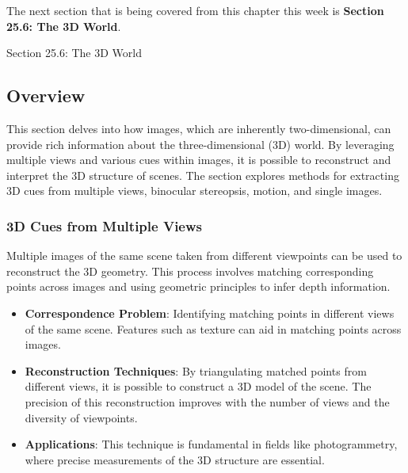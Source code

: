 The next section that is being covered from this chapter this week is \textbf{Section 25.6: The 3D World}.

\begin{notes}{Section 25.6: The 3D World}
    \subsection*{Overview}

    This section delves into how images, which are inherently two-dimensional, can provide rich information about the three-dimensional (3D) world. By leveraging multiple views and various cues within 
    images, it is possible to reconstruct and interpret the 3D structure of scenes. The section explores methods for extracting 3D cues from multiple views, binocular stereopsis, motion, and single images.
    
    \subsubsection*{3D Cues from Multiple Views}
    
    Multiple images of the same scene taken from different viewpoints can be used to reconstruct the 3D geometry. This process involves matching corresponding points across images and using geometric 
    principles to infer depth information.
    
    \begin{highlight}
    
        \begin{itemize}
            \item \textbf{Correspondence Problem}: Identifying matching points in different views of the same scene. Features such as texture can aid in matching points across images.
            \item \textbf{Reconstruction Techniques}: By triangulating matched points from different views, it is possible to construct a 3D model of the scene. The precision of this reconstruction improves 
            with the number of views and the diversity of viewpoints.
            \item \textbf{Applications}: This technique is fundamental in fields like photogrammetry, where precise measurements of the 3D structure are essential.
        \end{itemize}
    
    \end{highlight}
    

\end{notes}
